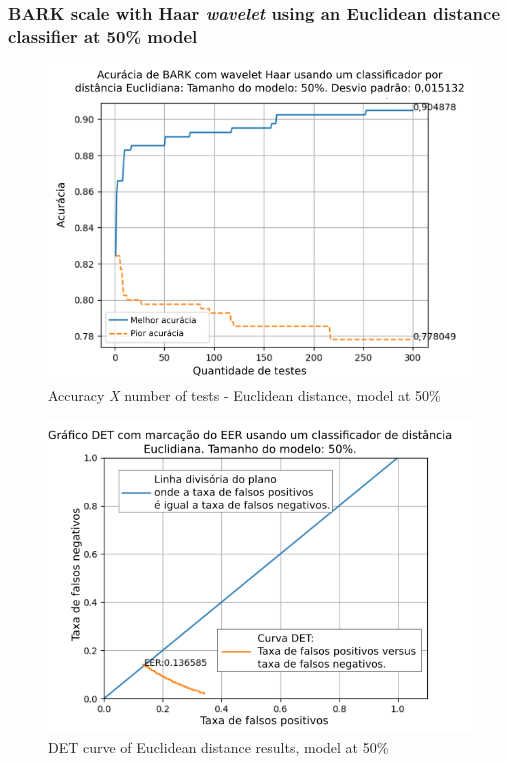 		\subsubsection{BARK scale with Haar \textit{wavelet} using an Euclidean distance classifier at 50\% model}
		
			
			
			\begin{figure}[!ht]
				\centering
				\includegraphics[width=\linewidth]{images/results/confusionMatrices/classifier_Euclidian_50}
				\caption{Accuracy \textit{X} number of tests - Euclidean distance, model at 50\%}
				\label{fig:classifiereuclidian50}
			\end{figure}
			
			\begin{figure}[!h]
				\centering
				\includegraphics[width=.9\linewidth]{images/results/det/DET_for_classifier_Euclidian_50}
				\caption{DET curve of Euclidean distance results, model at 50\%}
				\label{fig:detforclassifiereuclidian50}
			\end{figure}
		
